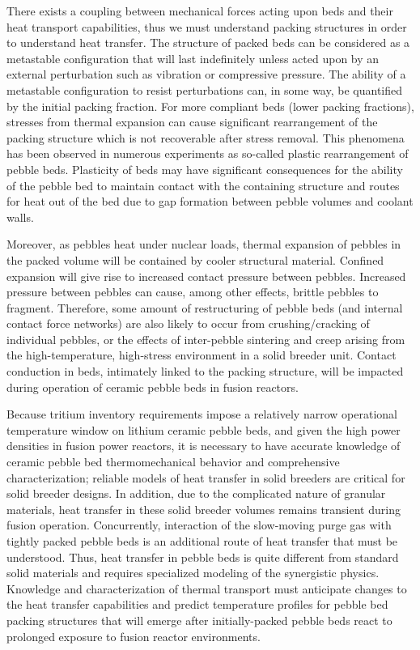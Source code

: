 There exists a coupling between mechanical forces acting upon beds and their heat transport capabilities, thus we must understand packing structures in order to understand heat transfer. The structure of packed beds can be considered as a metastable configuration that will last indefinitely unless acted upon by an external perturbation such as vibration or compressive pressure.\cite{Jaeger1996} The ability of a metastable configuration to resist perturbations can, in some way, be quantified by the initial packing fraction. For more compliant beds (lower packing fractions), stresses from thermal expansion can cause significant rearrangement of the packing structure which is not recoverable after stress removal. This phenomena has been observed in numerous experiments as so-called plastic rearrangement of pebble beds.\cite{Reimann:2002kl,Reimann:2000tw,Zhang2015} Plasticity of beds may have significant consequences for the ability of the pebble bed to maintain contact with the containing structure and routes for heat out of the bed due to gap formation between pebble volumes and coolant walls. 

Moreover, as pebbles heat under nuclear loads, thermal expansion of pebbles in the packed volume will be contained by cooler structural material. Confined expansion will give rise to increased contact pressure between pebbles. Increased pressure between pebbles can cause, among other effects, brittle pebbles to fragment. Therefore, some amount of restructuring of pebble beds (and internal contact force networks) are also likely to occur from crushing/cracking of individual pebbles, or the effects of inter-pebble sintering and creep arising from the high-temperature, high-stress environment in a solid breeder unit. Contact conduction in beds, intimately linked to the packing structure, will be impacted during operation of ceramic pebble beds in fusion reactors.

Because tritium inventory requirements impose a relatively narrow operational temperature window on lithium ceramic pebble beds, and given the high power densities in fusion power reactors, it is necessary to have accurate knowledge of ceramic pebble bed thermomechanical behavior and comprehensive characterization; reliable models of heat transfer in solid breeders are critical for solid breeder designs. In addition, due to the complicated nature of granular materials, heat transfer in these solid breeder volumes remains transient during fusion operation. Concurrently, interaction of the slow-moving purge gas with tightly packed pebble beds is an additional route of heat transfer that must be understood. Thus, heat transfer in pebble beds is quite different from standard solid materials and requires specialized modeling of the synergistic physics. Knowledge and characterization of thermal transport must anticipate changes to the heat transfer capabilities and predict temperature profiles for pebble bed packing structures that will emerge after initially-packed pebble beds react to prolonged exposure to fusion reactor environments.


